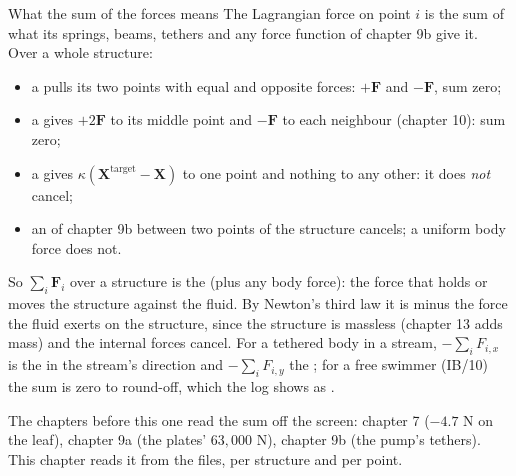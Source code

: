 \documentclass[aspectratio=169,11pt]{beamer}
\begin{document}
\begin{frame}{What the sum of the forces means}
\label{fr:sum}
\small The Lagrangian force on point $i$ is the sum of what its springs, beams, tethers and any force function of chapter 9b give it. Over a whole structure:
\begin{itemize}
  \item a  pulls its two points with equal and opposite forces: $+\mathbf{F}$ and $-\mathbf{F}$, sum zero;
  \item a  gives $+2\mathbf{F}$ to its middle point and $-\mathbf{F}$ to each neighbour (chapter 10): sum zero;
  \item a  gives $\kappa(\mathbf{X}^{\mathrm{target}} - \mathbf{X})$ to one point and nothing to any other: it does \emph{not} cancel;
  \item an  of chapter 9b between two points of the structure cancels; a uniform body force does not.
\end{itemize}
\vspace{1mm}
So $\sum_i \mathbf{F}_i$ over a structure is the  (plus any body force): the force that holds or moves the structure against the fluid. By Newton's third law it is minus the force the fluid exerts on the structure, since the structure is massless (chapter 13 adds mass) and the internal forces cancel. For a tethered body in a stream, $-\sum_i F_{i,x}$ is the  in the stream's direction and $-\sum_i F_{i,y}$ the ; for a free swimmer (IB/10) the sum is zero to round-off, which the log shows as .
\vspace{1mm}
\begin{punchbox}
\footnotesize The chapters before this one read the sum off the screen: chapter 7 ($-4.7$ N on the leaf), chapter 9a (the plates' $63{,}000$ N), chapter 9b (the pump's tethers). This chapter reads it from the files, per structure and per point.
\end{punchbox}
\end{frame}
\end{document}
